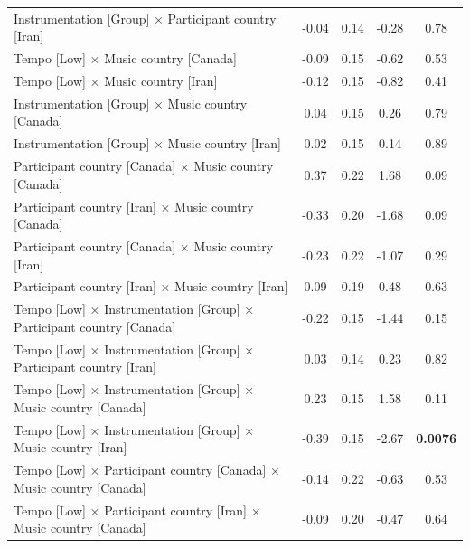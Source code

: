 \documentclass[
  bookmarksnumbered]{article}
\begin{document}
\begin{table}[H]
{\begin{tabular}[t]{lcccc}
\hspace{1em}Instrumentation [Group] × Participant country [Iran] & -0.04 & 0.14 & -0.28 & 0.78\\
\hspace{1em}Tempo [Low] × Music country [Canada] & -0.09 & 0.15 & -0.62 & 0.53\\
\hspace{1em}Tempo [Low] × Music country [Iran] & -0.12 & 0.15 & -0.82 & 0.41\\
\hspace{1em}Instrumentation [Group] × Music country [Canada] & 0.04 & 0.15 & 0.26 & 0.79\\
\hspace{1em}Instrumentation [Group] × Music country [Iran] & 0.02 & 0.15 & 0.14 & 0.89\\
\hspace{1em}Participant country [Canada] × Music country [Canada] & 0.37 & 0.22 & 1.68 & 0.09\\
\hspace{1em}Participant country [Iran] × Music country [Canada] & -0.33 & 0.20 & -1.68 & 0.09\\
\hspace{1em}Participant country [Canada] × Music country [Iran] & -0.23 & 0.22 & -1.07 & 0.29\\
\hspace{1em}Participant country [Iran] × Music country [Iran] & 0.09 & 0.19 & 0.48 & 0.63\\
\hspace{1em}Tempo [Low] × Instrumentation [Group] × Participant country [Canada] & -0.22 & 0.15 & -1.44 & 0.15\\
\hspace{1em}Tempo [Low] × Instrumentation [Group] × Participant country [Iran] & 0.03 & 0.14 & 0.23 & 0.82\\
\hspace{1em}Tempo [Low] × Instrumentation [Group] × Music country [Canada] & 0.23 & 0.15 & 1.58 & 0.11\\
\hspace{1em}Tempo [Low] × Instrumentation [Group] × Music country [Iran] & -0.39 & 0.15 & -2.67 & \textbf{0.0076}\\
\hspace{1em}Tempo [Low] × Participant country [Canada] × Music country [Canada] & -0.14 & 0.22 & -0.63 & 0.53\\
\hspace{1em}Tempo [Low] × Participant country [Iran] × Music country [Canada] & -0.09 & 0.20 & -0.47 & 0.64\\

\end{tabular}}
\end{table}
\end{document}
